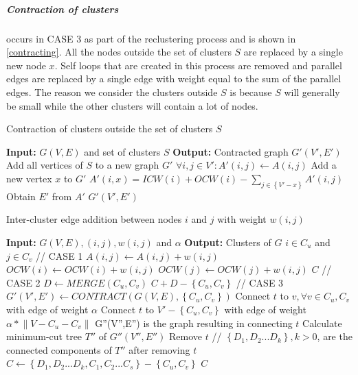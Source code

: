 \subparagraph{Contraction of clusters} occurs in CASE 3 as part of the reclustering process and is shown in \ref{contracting}. All the nodes outside the set of clusters $S$ are replaced by a single new node $x$. Self loops that are created in this process are removed and parallel edges are replaced by a single edge with weight equal to the sum of the parallel edges. The reason we consider the clusters outside $S$ is because $S$ will generally be small while the other clusters will contain a lot of nodes.

\begin{algorithm}
\caption{Contraction of clusters outside the set of clusters $S$}
\label{contracting}
\begin{algorithmic}
\STATE \textbf{Input:} $G(V,E)$ and set of clusters $S$ 
\STATE \textbf{Output:} Contracted graph $G'(V',E')$
\STATE Add all vertices of $S$ to a new graph $G'$
\STATE $\forall i,j \in V' : A'(i,j) \leftarrow A(i,j)$
\STATE Add a new vertex $x$ to $G'$
	\STATE $A'(i,x) = ICW(i) + OCW(i) - \sum_{j \in \left\{ V' - x \right\} }{A'(i,j)}$
\ENDFOR
\STATE Obtain $E'$ from $A'$
\RETURN $G'(V',E')$
\end{algorithmic}
\end{algorithm}


\begin{algorithm}
\caption{Inter-cluster edge addition between nodes $i$ and $j$ with weight $w(i,j)$}
\label{intercluster}
\begin{algorithmic}
\STATE \textbf{Input:} $G(V,E), (i,j), w(i,j)$ and $\alpha$ 
\STATE \textbf{Output:} Clusters of $G$
\STATE $i \in C_u$ and $j \in C_v$
	\STATE // CASE 1
	\STATE $A(i,j) \leftarrow A(i,j) + w(i,j)$
	\STATE $OCW(i) \leftarrow OCW(i) + w(i,j)$
	\STATE $OCW(j) \leftarrow OCW(j) + w(i,j)$
	\RETURN $C$
	\STATE // CASE 2
	\STATE $D \leftarrow MERGE(C_u,C_v)$
	\RETURN $C + D - \left\{C_u,C_v\right\}$
\ELSE
	\STATE // CASE 3
	\STATE $G'(V',E') \leftarrow CONTRACT(G(V,E),\left\{C_u,C_v\right\} )$
	\STATE Connect $t$ to $v, \forall v \in C_u,C_v$ with edge of weight $\alpha$
	\STATE Connect $t$ to $V' - \left\{C_u, C_v\right\}$ with edge of weight $\alpha * \left\| V - C_u - C_v \right\|$
	\STATE G''(V'',E'') is the graph resulting in connecting $t$
	\STATE Calculate minimum-cut tree $T''$ of $G''(V'',E'')$
	\STATE Remove $t$
	\STATE // $\left\{D_1,D_2...D_k\right\}, k > 0$, are the connected components of $T''$ after removing $t$
	\STATE $C \leftarrow \left\{D_1,D_2...D_k,C_1,C_2...C_s\right\} - \left\{ C_u,C_v \right\}$
	\RETURN $C$
\ENDIF
\end{algorithmic}
\end{algorithm}

